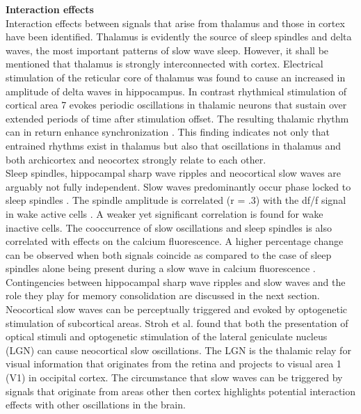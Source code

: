 \textbf{Interaction effects}\\
Interaction effects between signals that arise from thalamus and those in cortex have been identified. Thalamus is evidently the source of sleep spindles and delta waves, the most important patterns of slow wave sleep. However, it shall be mentioned that thalamus is strongly interconnected with cortex. Electrical stimulation of the reticular core of thalamus was found to cause an increased in amplitude of delta waves in hippocampus. In contrast rhythmical stimulation of cortical area 7 evokes periodic oscillations in thalamic neurons that sustain over extended periods of time after stimulation offset. The resulting thalamic rhythm can in return enhance synchronization \parencite[p. 21]{steriade1984thalamus}. This finding indicates not only that entrained rhythms exist in thalamus but also that oscillations in thalamus and both archicortex and neocortex strongly relate to each other.\\
Sleep spindles, hippocampal sharp wave ripples and neocortical slow waves are arguably not fully independent. Slow waves predominantly occur phase locked to sleep spindles \parencite{demanuele2017coordination}. The spindle amplitude is correlated (r = .3) with the df/f signal in wake active cells \parencite{niethard2018cortical}. A weaker yet significant correlation is found for wake inactive cells. The cooccurrence of slow oscillations and sleep spindles is also correlated with effects on the calcium fluorescence. A higher percentage change can be observed when both signals coincide as compared to the case of sleep spindles alone being present during a slow wave in calcium fluorescence \parencite{niethard2018cortical}. Contingencies between hippocampal sharp wave ripples and slow waves and the role they play for memory consolidation are discussed in the next section.\\
Neocortical slow waves can be perceptually triggered and evoked by optogenetic stimulation of subcortical areas. Stroh et al. \parencite*{stroh2013making} found that both the presentation of optical stimuli and optogenetic stimulation of the lateral geniculate nucleus (LGN) can cause neocortical slow oscillations. The LGN is the thalamic relay for visual information that originates from the retina and projects to visual area 1 (V1) in occipital cortex. The circumstance that slow waves can be triggered by signals that originate from areas other then cortex highlights potential interaction effects with other oscillations in the brain.\\
